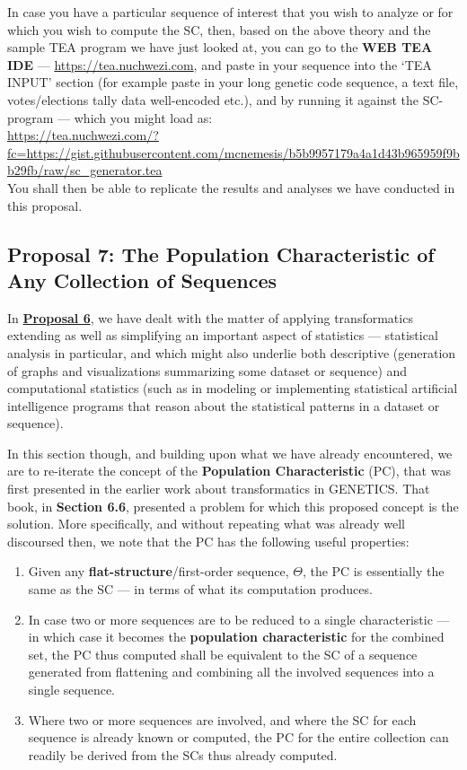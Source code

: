 \documentclass[12pt,a4paper]{article}
\begin{document}
In case you have a particular sequence of interest that you wish to analyze or for which you wish to compute the SC, then, based on the above theory and the sample TEA program we have just looked at, you can go to the \textbf{WEB TEA IDE} --- \url{https://tea.nuchwezi.com}, and paste in your sequence into the `TEA INPUT' section (for example paste in your long genetic code sequence, a text file, votes/elections tally data well-encoded etc.), and by running it against the SC-program --- which you might load as:\\

\url{https://tea.nuchwezi.com/?fc=https://gist.githubusercontent.com/mcnemesis/b5b9957179a4a1d43b965959f9bb29fb/raw/sc_generator.tea}\\


You shall then be able to replicate the results and analyses we have conducted in this proposal.


\subsection{Proposal 7: The Population Characteristic of Any Collection of Sequences\cite{lutalo_2025_trans_genetics}}
\label{PROP7}


In \textbf{\hyperref[PROP6]{Proposal 6}}, we have dealt with the matter of applying transformatics extending as well as simplifying an important aspect of statistics --- statistical analysis in particular, and which might also underlie both descriptive (generation of graphs and visualizations summarizing some dataset or sequence) and computational statistics (such as in modeling or implementing statistical artificial intelligence programs that reason about the statistical patterns in a dataset or sequence).

In this section though, and building upon what we have already encountered, we are to re-iterate the concept of the \textbf{Population Characteristic} (PC), that was first presented in the earlier work about transformatics in GENETICS\cite{lutalo_2025_trans_genetics}. That book, in 	\textbf{Section 6.6}, presented a problem for which this proposed concept is the solution. More specifically, and without repeating what was already well discoursed then, we note that the PC has the following useful properties:

\begin{enumerate}
\item Given any \textbf{flat-structure}/first-order sequence, $\Theta$, the PC is essentially the same as the SC --- in terms of what its computation produces.
\item In case two or more sequences are to be reduced to a single characteristic --- in which case it becomes the \textbf{population characteristic} for the combined set, the PC thus computed shall be equivalent to the SC of a sequence generated from flattening and combining all the involved sequences into a single sequence.
\item Where two or more sequences are involved, and where the SC for each sequence is already known or computed, the PC for the entire collection can readily be derived from the SCs thus already computed.
\end{enumerate}
\end{document}
